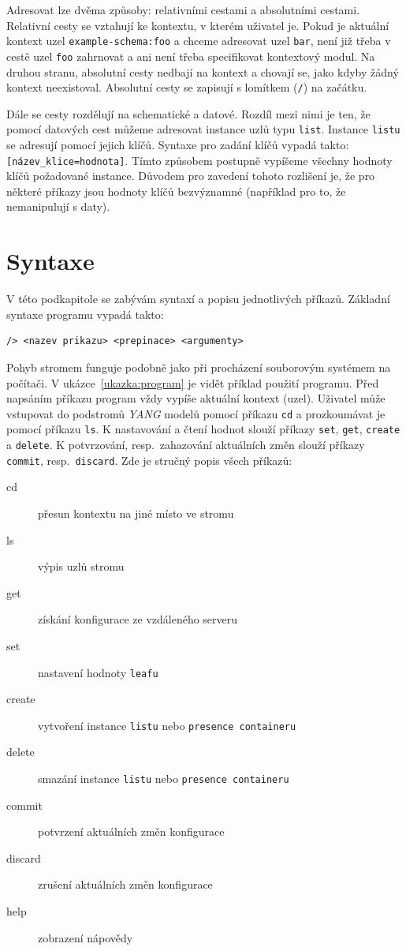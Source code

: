 \documentclass[thesis=B,czech,hidelinks]{FITthesis}[2019/03/06]
\begin{document}
Adresovat lze dvěma způsoby: relativními cestami a absolutními cestami. Relativní cesty se vztahují ke kontextu, v kterém uživatel je. Pokud je aktuální kontext uzel \texttt{example-schema:foo} a chceme adresovat uzel \texttt{bar}, není již třeba v cestě uzel \texttt{foo} zahrnovat a ani není třeba specifikovat kontextový modul. Na druhou stranu, absolutní cesty nedbají na kontext a chovají se, jako kdyby žádný kontext neexistoval. Absolutní cesty se zapisují s lomítkem (\texttt{/}) na začátku.

Dále se cesty rozdělují na schematické a datové. Rozdíl mezi nimi je ten, že pomocí datových cest můžeme adresovat instance uzlů typu \texttt{list}. Instance \texttt{listu} se adresují pomocí jejich klíčů. Syntaxe pro zadání klíčů vypadá takto: \verb¨[název_klice=hodnota]¨. Tímto způsobem postupně vypíšeme všechny hodnoty klíčů požadované instance. Důvodem pro zavedení tohoto rozlišení je, že pro některé příkazy jsou hodnoty klíčů bezvýznamné (například pro to, že nemanipulují s daty).

\section{Syntaxe}\label{syntaxe}
V této podkapitole se zabývám syntaxí a popisu jednotlivých příkazů. Základní syntaxe programu vypadá takto:
\begin{verbatim}
/> <nazev prikazu> <prepinace> <argumenty>
\end{verbatim}
Pohyb stromem funguje podobně jako při procházení souborovým systémem na počítači. V ukázce~\ref{ukazka:program} je vidět příklad použití programu. Před napsáním příkazu program vždy vypíše aktuální kontext (uzel). Uživatel může vstupovat do podstromů \textit{YANG} modelů pomocí příkazu \texttt{cd} a prozkoumávat je pomocí příkazu \texttt{ls}. K nastavování a čtení hodnot slouží příkazy \texttt{set}, \texttt{get}, \texttt{create} a \texttt{delete}. K potvrzování, resp.\ zahazování aktuálních změn slouží příkazy \texttt{commit}, resp.\ \texttt{discard}. Zde je stručný popis všech příkazů:
\begin{description}
\item[cd]{přesun kontextu na jiné místo ve stromu}
\item[ls]{výpis uzlů stromu}
\item[get]{získání konfigurace ze vzdáleného serveru}
\item[set]{nastavení hodnoty \texttt{leafu}}
\item[create]{vytvoření instance \texttt{listu} nebo \texttt{presence containeru}}
\item[delete]{smazání instance \texttt{listu} nebo \texttt{presence containeru}}
\item[commit]{potvrzení aktuálních změn konfigurace}
\item[discard]{zrušení aktuálních změn konfigurace}
\item[help]{zobrazení nápovědy}
\end{description}
\end{document}
